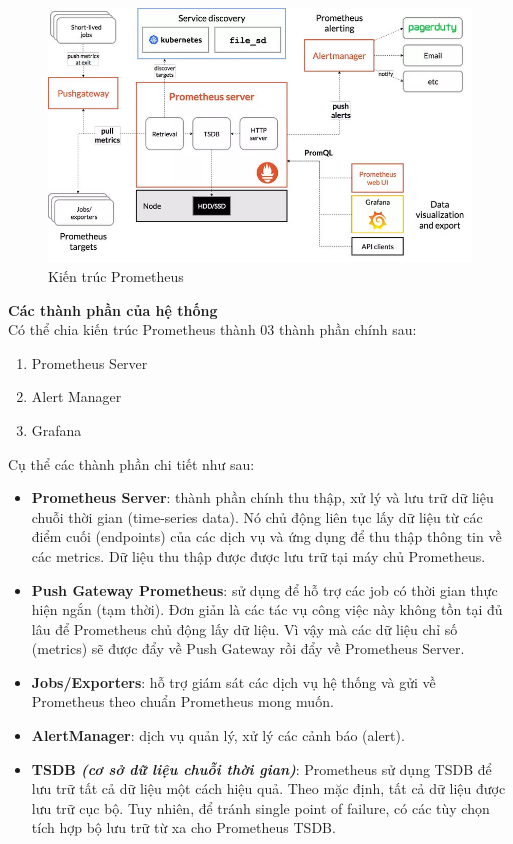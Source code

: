 \begin{figure}[H]
  \begin{center}
    \includegraphics[scale=0.45]{images/phat/prometheus_architecture.jpg}
    \caption{Kiến trúc Prometheus}
  \end{center}
\end{figure}
\textbf{Các thành phần của hệ thống}\\[0.5cm]
\indent Có thể chia kiến trúc Prometheus thành 03 thành phần chính sau: 
\begin{enumerate}
    \item Prometheus Server
    \item Alert Manager
    \item Grafana
\end{enumerate}
\indent Cụ thể các thành phần chi tiết như sau:
\begin{itemize}
    \item \textbf{Prometheus Server}: thành phần chính thu thập, xử lý và lưu trữ dữ liệu chuỗi thời gian (time-series data).
    Nó chủ động liên tục lấy dữ liệu từ các điểm cuối (endpoints) của các dịch vụ và ứng dụng để thu thập thông tin về các metrics.
    Dữ liệu thu thập được được lưu trữ tại máy chủ Prometheus.
    \item \textbf{Push Gateway Prometheus}: sử dụng để hỗ trợ các job có thời gian thực hiện ngắn (tạm thời). Đơn giản là các tác vụ công việc này không tồn tại đủ lâu để Prometheus chủ động lấy dữ liệu. Vì vậy mà các dữ liệu chỉ số (metrics) sẽ được đẩy về Push Gateway rồi đẩy về Prometheus Server.
    \item \textbf{Jobs/Exporters}: hỗ trợ giám sát các dịch vụ hệ thống và gửi về Prometheus theo chuẩn Prometheus mong muốn.
    \item \textbf{AlertManager}: dịch vụ quản lý, xử lý các cảnh báo (alert).
    \item \textbf{TSDB \textit{(cơ sở dữ liệu chuỗi thời gian)}}: Prometheus sử dụng TSDB để lưu trữ tất cả dữ liệu một cách hiệu quả. Theo mặc định, tất cả dữ liệu được lưu trữ cục bộ. Tuy nhiên, để tránh single point of failure, có các tùy chọn tích hợp bộ lưu trữ từ xa cho Prometheus TSDB.
\end{itemize}
